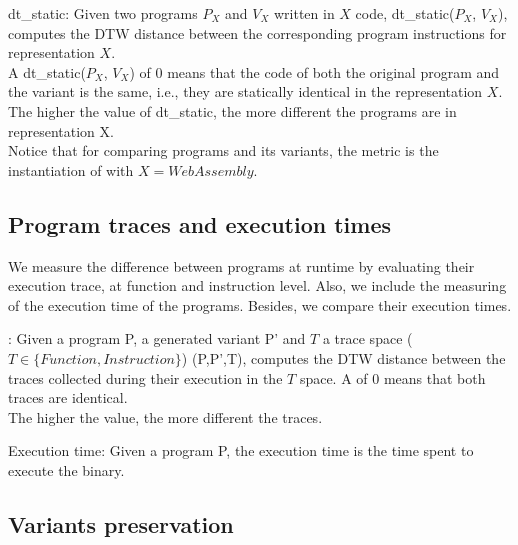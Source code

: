 \begin{metric}{dt\_static:}\label{metric:static1}
	Given two programs $P_X$ and $V_X$ written in $X$ code, dt\_static($P_X$, $V_X$), computes the DTW distance between the corresponding program instructions for representation $X$. \\
	
	A dt\_static($P_X$, $V_X$) of $0$ means that the code of both the original program and the variant is the same, i.e., they are statically identical in the representation $X$. The higher the value of dt\_static, the more different the programs are in representation X. \\

	Notice that for comparing \wasm programs and its variants, the metric is the instantiation of \DTWStatic with $X=WebAssembly$.
\end{metric}

\subsection{Program traces and execution times}

We measure the difference between programs at runtime by evaluating their execution trace, at function and instruction level. Also, we include the measuring of the execution time of the programs. Besides, we compare their execution times.


\begin{metric}{\DTW{}:}\label{metric:stack}
	Given a program P, a \tool generated variant P' and $T$ a trace space ($T \in \{Function, Instruction \}$) \DTW{}(P,P',T), computes the DTW distance between the traces collected during their execution in the $T$ space. A \DTW{} of $0$ means that both traces are identical. \\ 
	
	The higher the value, the more different the traces. 
\end{metric}


\begin{metric}{Execution time:}\label{metric:time}
	Given a \wasm program P, the execution time is the time spent to execute the binary.
\end{metric}

\subsection{Variants preservation}

